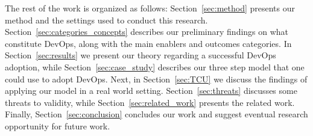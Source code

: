 The rest of the work is organized as follows: Section~\ref{sec:method} presents our method
and the settings used to conduct this research. Section~\ref{sec:categories_concepts} describes our
preliminary findings on what constitute DevOps, along with the main enablers
and outcomes categories. In Section~\ref{sec:results} we present our theory regarding
a successful DevOps adoption, while Section~\ref{sec:case_study} describes our three step
model that one could use to adopt DevOps. Next, in Section~\ref{sec:TCU} we discuss
the findings of applying our model in a real world setting. Section~\ref{sec:threats}
discusses some threats to validity, while Section~\ref{sec:related_work} presents the related
work. Finally, Section~\ref{sec:conclusion} concludes our work and suggest eventual research
opportunity for future work.

